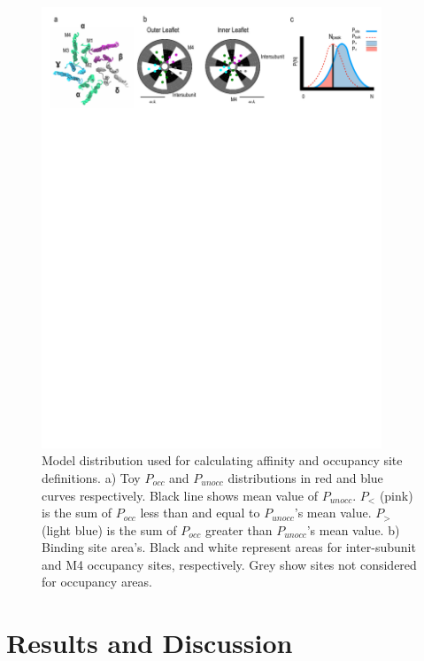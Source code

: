 \begin{figure}[!h]
	\center
	\includegraphics[width=4in]{Figures/PartialBIndingToy.pdf}

	\caption[ Model distribution used for calculating affinity and occupancy site definitions.] {Model distribution used for calculating affinity and occupancy site definitions. a)  Toy $P_{occ}$ and $P_{unocc}$ distributions in red and blue curves respectively. Black line shows mean value of $P_{unocc}$. $P_<$ (pink) is the sum of  $P_{occ}$ less than and equal to  $P_{unocc}$'s mean value. $P_>$ (light blue) is the sum of  $P_{occ}$ greater than $P_{unocc}$'s mean value. b) Binding site area's. Black and white represent areas for inter-subunit and M4 occupancy sites, respectively. Grey show sites not considered for occupancy areas.}
	\label{fig:PBT}
\end{figure}



\section{Results and Discussion}
\label{res}

